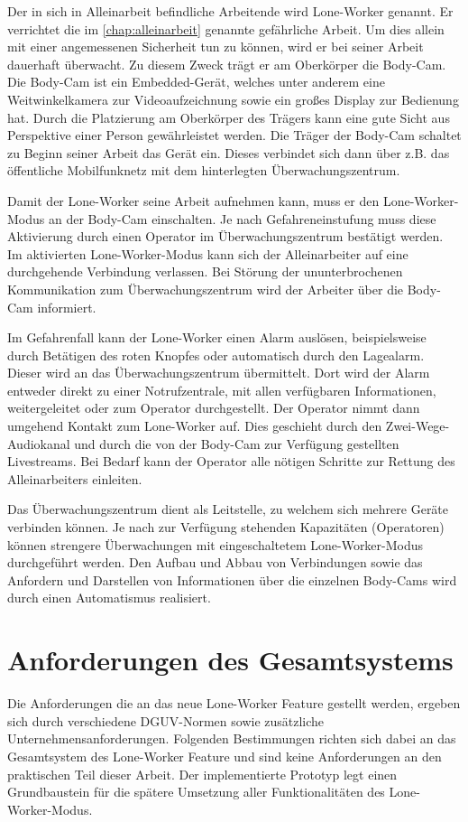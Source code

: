 \documentclass[thesis.tex]{subfiles}
\begin{document}
Der in sich in Alleinarbeit befindliche Arbeitende wird Lone-Worker genannt.
Er verrichtet die im \autoref{chap:alleinarbeit} genannte gefährliche Arbeit.
Um dies allein mit einer angemessenen Sicherheit tun zu können, wird er bei seiner Arbeit dauerhaft überwacht.
Zu diesem Zweck trägt er am Oberkörper die Body-Cam.
Die Body-Cam ist ein Embedded-Gerät, welches unter anderem eine Weitwinkelkamera zur Videoaufzeichnung sowie ein großes Display zur Bedienung hat.
Durch die Platzierung am Oberkörper des Trägers kann eine gute Sicht aus Perspektive einer Person gewährleistet werden.
Die Träger der Body-Cam schaltet zu Beginn seiner Arbeit das Gerät ein.
Dieses verbindet sich dann über z.B. das öffentliche Mobilfunknetz mit dem hinterlegten Überwachungszentrum.

Damit der Lone-Worker seine Arbeit aufnehmen kann, muss er den Lone-Worker-Modus an der Body-Cam einschalten.
Je nach Gefahreneinstufung muss diese Aktivierung durch einen Operator im Überwachungszentrum bestätigt werden.
Im aktivierten Lone-Worker-Modus kann sich der Alleinarbeiter auf eine durchgehende Verbindung verlassen.
Bei Störung der ununterbrochenen Kommunikation zum Überwachungszentrum wird der Arbeiter über die Body-Cam informiert.

Im Gefahrenfall kann der Lone-Worker einen Alarm auslösen, beispielsweise durch Betätigen des roten Knopfes oder automatisch durch den Lagealarm.
Dieser wird an das Überwachungszentrum übermittelt.
Dort wird der Alarm entweder direkt zu einer Notrufzentrale, mit allen verfügbaren Informationen, weitergeleitet oder zum Operator durchgestellt.
Der Operator nimmt dann umgehend Kontakt zum Lone-Worker auf.
Dies geschieht durch den Zwei-Wege-Audiokanal und durch die von der Body-Cam zur Verfügung gestellten Livestreams.
Bei Bedarf kann der Operator alle nötigen Schritte zur Rettung des Alleinarbeiters einleiten.

Das Überwachungszentrum dient als Leitstelle, zu welchem sich mehrere Geräte verbinden können.
Je nach zur Verfügung stehenden Kapazitäten (Operatoren) können strengere Überwachungen mit eingeschaltetem Lone-Worker-Modus durchgeführt werden.
Den Aufbau und Abbau von Verbindungen sowie das Anfordern und Darstellen von Informationen über die einzelnen Body-Cams wird
durch einen Automatismus realisiert.

\section{Anforderungen des Gesamtsystems}
Die Anforderungen die an das neue Lone-Worker Feature gestellt werden, ergeben sich durch verschiedene DGUV-Normen sowie zusätzliche Unternehmensanforderungen.
Folgenden Bestimmungen richten sich dabei an das Gesamtsystem des Lone-Worker Feature und sind keine Anforderungen an den praktischen Teil dieser Arbeit.
Der implementierte Prototyp legt einen Grundbaustein für die spätere Umsetzung aller Funktionalitäten des Lone-Worker-Modus.
\end{document}
